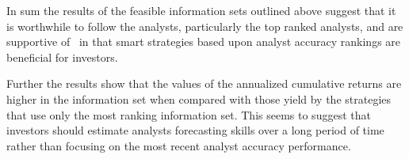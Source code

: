 \documentclass[a4paper,12pt,openright,notitlepage]{report}\usepackage[]{graphicx}\usepackage[]{color}
\begin{document}

In sum the results of the feasible information sets outlined above suggest that  it is worthwhile to follow the analysts, particularly the top ranked analysts, and are supportive of~\cite{desai2000ass} in that smart strategies based upon analyst accuracy rankings are beneficial for investors.

Further the results show that the values of the annualized cumulative returns are higher in the  information set when compared with those yield by the strategies that use only the most \naive{} ranking information set. This seems to suggest that investors should estimate analysts forecasting skills over a long period of time rather than focusing on the most recent analyst accuracy performance.


\end{document}
